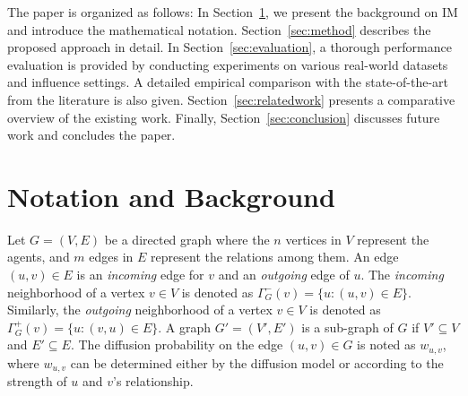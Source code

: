 \documentclass[final,5p,times,twocolumn]{elsarticle}
\newcommand\fixme[1]{#1}
\begin{document}
\fixme{The paper is organized as follows: 
In Section~\ref{sec:background}, we present 
the background on IM and introduce the mathematical notation. 
Section~\ref{sec:method} describes the proposed approach in detail.}
In Section~\ref{sec:evaluation}, a thorough performance evaluation \fixme{is provided by conducting experiments on various real-world datasets and influence settings. A detailed empirical comparison with the state-of-the-art from the literature is also given. Section~\ref{sec:relatedwork} presents a comparative overview of the existing work. Finally, Section~\ref{sec:conclusion} discusses future work and concludes the paper.}

\section{Notation and Background}\label{sec:background}

\fixme{Let $G = (V,E)$ be a} directed \fixme{graph where the $n$ vertices in $V$ represent the agents, and $m$ edges in $E$ represent the relations} among them. An edge $(u,v) \in E$ is an {\em incoming} edge for $v$ and an {\em outgoing} edge of $u$. The {\em incoming} \fixme{neighborhood of a vertex $v \in V$ is denoted as $\Gamma^-_{G}(v) = \{u: (u,v) \in E\}$.} Similarly, the {\em outgoing} neighborhood of a vertex $v \in V$ is denoted as $\Gamma^+_{G}(v) = \{u: (v,u) \in E\}$. A graph $G' = (V',E')$ is a sub-graph of $G$ if $V' \subseteq V$ and $E' \subseteq E$. The diffusion probability on the edge $(u, v) \in G$ is noted as $w_{u,v}$, where $w_{u,v}$ can be determined either by the diffusion model or according to the strength of $u$ and $v$'s relationship.
\end{document}
